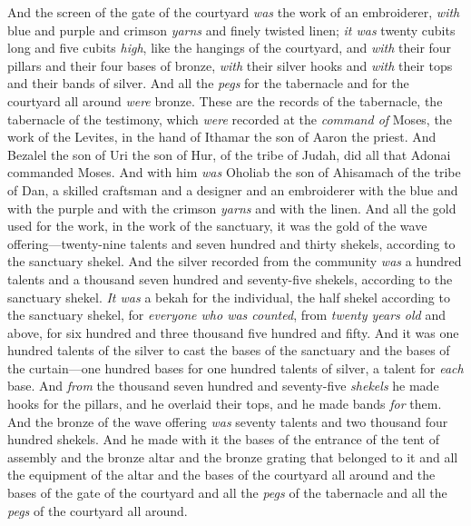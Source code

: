 \begin{biblechapter}
\verse And the screen of the gate of the courtyard \textit{was} the work of an embroiderer, \textit{with} blue and purple and crimson \textit{yarns} and finely twisted linen; \textit{it was} twenty cubits long and five cubits \textit{high}, like the hangings of the courtyard,
\verse and \textit{with} their four pillars and their four bases of bronze, \textit{with} their silver hooks and \textit{with} their tops and their bands of silver.
\verse And all the \textit{pegs} for the tabernacle and for the courtyard all around \textit{were} bronze.
 These are the records of the tabernacle, the tabernacle of the testimony, which \textit{were} recorded at the \textit{command of} Moses, the work of the Levites, in the hand of Ithamar the son of Aaron the priest.
\verse And Bezalel the son of Uri the son of Hur, of the tribe of Judah, did all that Adonai commanded Moses.
\verse And with him \textit{was} Oholiab the son of Ahisamach of the tribe of Dan, a skilled craftsman and a designer and an embroiderer with the blue and with the purple and with the crimson \textit{yarns} and with the linen.
\verse And all the gold used for the work, in the work of the sanctuary, it was the gold of the wave offering—twenty-nine talents and seven hundred and thirty shekels, according to the sanctuary shekel.
\verse And the silver recorded from the community \textit{was} a hundred talents and a thousand seven hundred and seventy-five shekels, according to the sanctuary shekel.
\verse \textit{It was} a bekah for the individual, the half shekel according to the sanctuary shekel, for \textit{everyone who was counted}, from \textit{twenty years old} and above, for six hundred and three thousand five hundred and fifty.
\verse And it was one hundred talents of the silver to cast the bases of the sanctuary and the bases of the curtain—one hundred bases for one hundred talents of silver, a talent for \textit{each} base.
\verse And \textit{from} the thousand seven hundred and seventy-five \textit{shekels} he made hooks for the pillars, and he overlaid their tops, and he made bands \textit{for} them.
\verse And the bronze of the wave offering \textit{was} seventy talents and two thousand four hundred shekels.
\verse And he made with it the bases of the entrance of the tent of assembly and the bronze altar and the bronze grating that belonged to it and all the equipment of the altar
\verse and the bases of the courtyard all around and the bases of the gate of the courtyard and all the \textit{pegs} of the tabernacle and all the \textit{pegs} of the courtyard all around.
\end{biblechapter}

